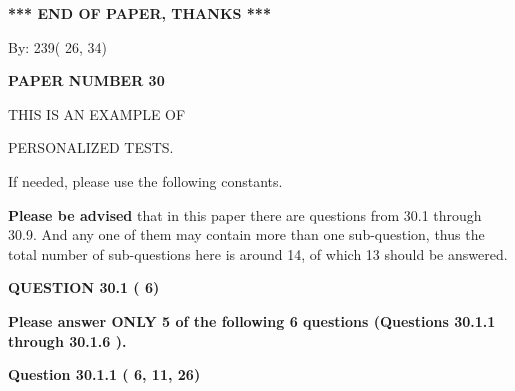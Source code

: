 \documentclass[12pt]{article}
\begin{document}
   
   
   
   
\vspace{1.0in} 
{\textbf{\large{ *** END OF PAPER, THANKS *** }}} 
   
   
\hspace{1.0in} By: 
         239(         26,          34)
   
   
   
   
\newpage 
\setcounter{page}{ 
    30001 } 
   
   
   
   
 {\textbf{ \Large{ PAPER NUMBER          30 }}}
   
   
\vspace{0.2in}
   
   
   
   
   
   
 \vspace{0.2in}
 
 
{\Huge  THIS IS AN EXAMPLE OF}
 
{\Huge  PERSONALIZED TESTS. }
 
If needed, please use the following constants.
 
 
 
{\textbf{\large{Please be advised}}} that in this paper there are questions from
30.1 through
30.9.
And any one of them may contain more than one sub-question, thus the total number
of sub-questions here is around 14, of which
13 should be answered.
 
\vspace{0.3in}
 
 
   
   
  
\vspace{0.2in}
  
{\textbf{\Large{QUESTION
30.1 
 (          6)
}}}
  
  
{\textbf{\Large{Please answer ONLY  %
           5 %
 of the following  %
           6 %
 questions (Questions  %
30.1.1 %
 through  %
30.1.6 %
 ). }}}
   
   
  
\vspace{0.2in}
  
{\textbf{\Large{Question
30.1.1 
 (          6,         11,         26)
}}}
  
  
 
 
\end{document}
